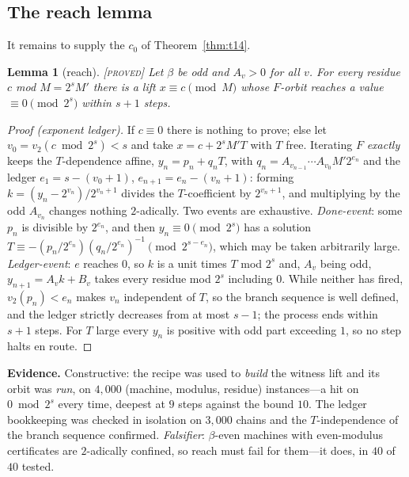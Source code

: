 \documentclass[11pt]{article}
\newtheorem{lemma}[theorem]{Lemma}
\theoremstyle{definition}
\theoremstyle{remark}
\newenvironment{evidence}
  {\par\smallskip\noindent\footnotesize\textbf{Evidence.}}
  {\par\smallskip}
\newcommand{\vp}[1]{v_{#1}}
\newcommand{\Proved}{\textsc{[proved]}}
\begin{document}
\subsection{The reach lemma}

It remains to supply the $c_0$ of Theorem~\ref{thm:t14}.

\begin{lemma}[reach]\label{lem:reach}
\Proved{}\; Let $\beta$ be odd and $A_v>0$ for all $v$.  For every residue $c$
mod $M=2^{s}M'$ there is a lift $x\equiv c\pmod M$ whose $F$-orbit reaches a
value $\equiv0\pmod{2^{s}}$ within $s+1$ steps.
\end{lemma}

\begin{proof}[Proof (exponent ledger)]
If $c\equiv0$ there is nothing to prove; else let
$v_0=\vp{2}(c\bmod 2^{s})<s$ and take $x=c+2^{s}M'T$ with $T$ free.  Iterating
$F$ \emph{exactly} keeps the $T$-dependence affine, $y_n=p_n+q_nT$, with
$q_n=A_{v_{n-1}}\cdots A_{v_0}M'2^{e_n}$ and the ledger $e_1=s-(v_0+1)$,
$e_{n+1}=e_n-(v_n+1)$: forming $k=(y_n-2^{v_n})/2^{v_n+1}$ divides the
$T$-coefficient by $2^{v_n+1}$, and multiplying by the odd $A_{v_n}$ changes
nothing $2$-adically.  Two events are exhaustive.  \emph{Done-event}: some
$p_n$ is divisible by $2^{e_n}$, and then $y_n\equiv0\pmod{2^{s}}$ has a
solution $T\equiv-(p_n/2^{e_n})(q_n/2^{e_n})^{-1}\pmod{2^{s-e_n}}$, which may
be taken arbitrarily large.  \emph{Ledger-event}: $e$ reaches $0$, so $k$ is a
unit times $T$ mod $2^{s}$ and, $A_v$ being odd, $y_{n+1}=A_vk+B_v$ takes every
residue mod $2^{s}$ including $0$.  While neither has fired,
$\vp{2}(p_n)<e_n$ makes $v_n$ independent of $T$, so the branch sequence is
well defined, and the ledger strictly decreases from at most $s-1$; the process
ends within $s+1$ steps.  For $T$ large every $y_n$ is positive with odd part
exceeding $1$, so no step halts en route.
\end{proof}

\begin{evidence}
Constructive: the recipe was used to \emph{build} the witness lift and its
orbit was \emph{run}, on $4{,}000$ (machine, modulus, residue) instances---a
hit on $0\bmod 2^{s}$ every time, deepest at $9$ steps against the bound $10$.
The ledger bookkeeping was checked in isolation on $3{,}000$ chains and the
$T$-independence of the branch sequence confirmed.  \emph{Falsifier}:
$\beta$-even machines with even-modulus certificates are $2$-adically confined,
so reach must fail for them---it does, in $40$ of $40$ tested.
\end{evidence}
\end{document}
